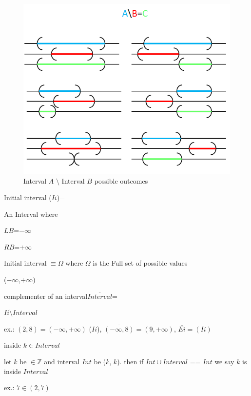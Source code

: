 \begin{figure} [!ht]
	\centering
	\includegraphics[width=150mm, keepaspectratio]{figures/aminusb.png}
	\caption{\label{fig:aminusb} Interval $A$ $\setminus$ Interval $B$ possible outcomes}
\end{figure}

\begin{definition}{Initial interval ($Ii$)=}
	
	An Interval where
	
	$LB$=$-\infty$
	
	$RB$=$+\infty$
	
	Initial interval $\equiv \Omega$ where $\Omega$ is the Full set of possible values
	
	($-\infty$,$+\infty$)
\end{definition}


\begin{definition}{complementer of an interval$ \overline{Interval}$=}
	
	$Ii \setminus Interval$
	
	ex.: $\overline{(2,8)}=(-\infty,+\infty)$ ($Ii$), $\overline{(-\infty,8)}=(9,+\infty)$, $\overline{Ei}=(Ii)$
\end{definition}

\begin{definition}{inside $k \in Interval$}
	
	let $k$ be $\in \mathbb{Z}$ and interval $Int$ be ($k$, $k$). then if $Int \cup Interval$ == $Int$ we say $k$ is inside $Interval$
	
	ex.: $7 \in (2,7)$
\end{definition}




